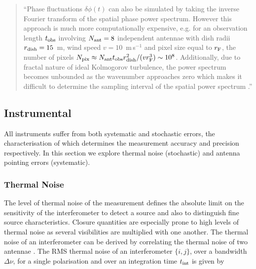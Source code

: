\begin{quotation}
``Phase fluctuations $\delta\phi(t)$ can also be simulated by taking the inverse Fourier transform of the spatial phase power spectrum. However this approach is much more computationally expensive, e.g. for an observation length $t_{\rm obs}$ involving $N_{\rm ant}=8$ independent antennae with dish radii $r_{\rm dish}=15$~m, wind speed $v=10$~m\,s$^{-1}$ and pixel size equal to $r_{\rm F}$, the number of pixels $N_{\rm pix} \approx N_{\rm ant} t_{\rm obs} r_{\rm dish}^2/(v r_{\rm F}^3)  \sim 10^8$. Additionally, due to fractal nature of ideal Kolmogorov turbulence, the power spectrum becomes unbounded as the wavenumber approaches zero which makes it difficult to determine the sampling interval of the spatial power spectrum \citep{Lane_1992}.''\\
\citep{Blecher_2016}
\end{quotation}

\subsection{Instrumental}\label{sec:instrument}

All instruments suffer from both systematic and stochastic errors, the characterisation of which determines the measurement accuracy and precision respectively. In this section we explore thermal noise (stochastic) and antenna pointing errors (systematic). 

\subsubsection{Thermal Noise}


The level of thermal noise of the measurement defines the absolute limit on the sensitivity of the interferometer to detect a source and also to distinguish fine source characteristics. Closure quantities are especially prone to high levels of thermal noise as several visibilities are multiplied with one another. The thermal noise of an interferometer can be derived by correlating the thermal noise of two antennae \citep*{Wrobel_1999}. The  RMS thermal noise of an interferometer $\{i,j\}$, over a bandwidth $\Delta \nu$, for a single polarisation and over an integration time $t_{\rm int}$ is given by 

